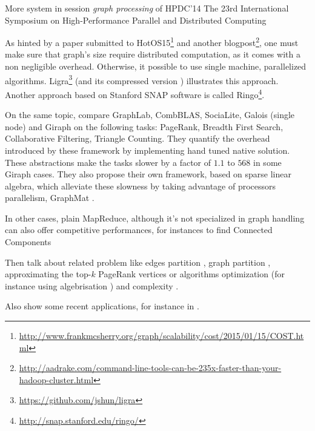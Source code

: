 More system in session \emph{graph processing} of HPDC'14 The 23rd International
Symposium on High-Performance Parallel and Distributed Computing 

As hinted by a paper submitted to
HotOS15\footnote{\href{http://www.frankmcsherry.org/graph/scalability/cost/2015/01/15/COST.html}%
	{http://www.frankmcsherry.org/graph/scalability/cost/2015/01/15/COST.html}}
and another
blogpost\footnote{\href{http://aadrake.com/command-line-tools-can-be-235x-faster-than-your-hadoop-cluster.html}%
	{http://aadrake.com/command-line-tools-can-be-235x-faster-than-your-hadoop-cluster.html}},
one must make sure that graph's size require distributed computation, as it
comes with a non negligible overhead. Otherwise, it possible to use single
machine, parallelized algorithms.
Ligra\footnote{\href{https://github.com/jshun/ligra}%
	{https://github.com/jshun/ligra}} \autocite{Ligra13} (and its compressed
version \autocite{Ligra15}) illustrates this approach. Another approach based
on Stanford SNAP software is called Ringo\footnote{\href{http://snap.stanford.edu/ringo/}%
	{http://snap.stanford.edu/ringo/}}\autocite{Ringo15}.

On the same topic, \textcite{NativeBenchmark14} compare GraphLab, CombBLAS,
SociaLite, Galois (single node) and Giraph on the following tasks: PageRank,
Breadth First Search, Collaborative Filtering, Triangle Counting. They quantify
the overhead introduced by these framework by implementing hand tuned native
solution. These abstractions make the tasks slower by a factor of $1.1$ to
$568$ in some Giraph cases. They also propose their own framework, based on
sparse linear algebra, which alleviate these slowness by taking advantage of
processors parallelism, GraphMat \autocite{GraphMat15}.

In other cases, plain MapReduce\autocite{MapReduce04}, although it's not
specialized in graph handling can also offer competitive performances, for
instances to find Connected Components
\autocites{Kardes2014}{Qin2014}{Kiveris2014}

Then talk about related problem like edges partition \autocite{Bourse2014a},
graph partition \autocites{Partition13}{Tsourakakis2014}{Partition14},
approximating the top-$k$ PageRank vertices \autocite{Mitliagkas2015} or
algorithms optimization \autocites{Salihoglu14}{Salihoglu2014b} (for instance
using algebrisation \autocite{Kaski2015}) and complexity
\autocite{ComputationBounds14,Pandurangan2015}.

Also show some recent applications, for instance in \pcc{}
\autocites{Bonchi2012}{Chierichetti2014}.
\autocite{Quick2012}
